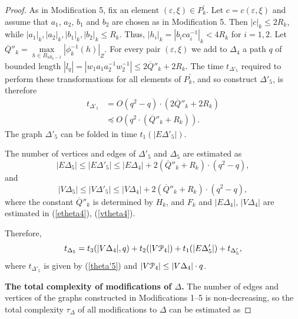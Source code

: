 \documentclass[a4paper,12pt]{article}
\newcommand{\G}{\Gamma }
\newcommand{\D}{\Delta }
\newcommand{\e}{\varepsilon }
\renewcommand{\t}{\tau }
\newcommand{\cP}{{\cal{P}}}
\numberwithin{equation}{section}
\numberwithin{figure}{section}
\begin{document}
\begin{proof}
As in Modification 5, fix an element $(\e,\xi)\in P_k^\prime$.
Let $c=c(\e,\xi)$ and assume that $a_1$, $a_2$, $b_1$
and $b_2$  are chosen as in Modification 5. Then $|c|_k\le 2R_k$,
while $|a_1|_k, |a_2|_k, |b_1|_k,|b_2|_k \le R_k$.
Thus, $|h_i|_k = |b_ica_i^{-1}|_k < 4R_k$ for
$i=1,2$. Let $\overline{Q}''_k=\max\limits_{h \in
B_{4R_k-1}}|\phi^{-1}_k(h)|_Z$. For every pair $(\e,\xi) $ we add
to $\D_4$ a path $q$ of bounded length $|l_q|= |w_1 a_1a_2^{-1}
w_2^{-1}| \le 2 \overline{Q}''_k +2 R_k$.
The time $t_{\D'_5}$ required to perform
these transformations for all elements of $P_k^\prime$, and
so construct $\D'_5$, is therefore
\begin{equation}\label{theta'5}
\begin{split}
t_{\D'_5} &= O(q^2-q)\cdot(2\overline{Q}''_k+2R_k)\\
&\preceq O(q^2 \cdot (\overline{Q}''_k+R_k)).
\end{split}
\end{equation}
The graph $\D'_5$ can be folded in time $t_1(|E\D'_5|)$.

The number of vertices and edges of $\D'_5$ and $\D_5$ are estimated as
\begin{equation}\label{etheta5}
|E\D_5| \le |E\D'_5| \le |E\D_4|+ 2(\overline{Q}''_k+
R_k)\cdot(q^2-q),
%
\end{equation}
and
\begin{equation}\label{vtheta5}
|V\D_5| \le |V \D'_5| \le |V
\D_4|+2(\overline{Q}''_k+R_k)\cdot(q^2-q),
\end{equation}
where the constant $\overline{Q}''_k$ is determined by $H_k$, and
$F_k$ and $|E \D_4|$, $|V \D_4|$ are estimated in (\ref{etheta4}),
(\ref{vtheta4}).


Therefore,
\begin{equation}\label{theta5}
t_{\D_5} = t_3(|V \D_4|, q) + t_2(|V\cP_4|)+ t_1(|E\D'_5|) +
t_{\D'_5},
\end{equation}
where $t_{\D'_5}$ is given by (\ref{theta'5}) and $|V\cP_4| \le |V
\D_4|\cdot q $.


{\bf The total complexity of modifications of $\D$.} The number of
edges and vertices of the graphs constructed in Modifications 1--5 is non-decreasing, so the
total complexity $\t_\D$ of all modifications to $\D$ can be estimated as


\end{proof}
\end{document}
